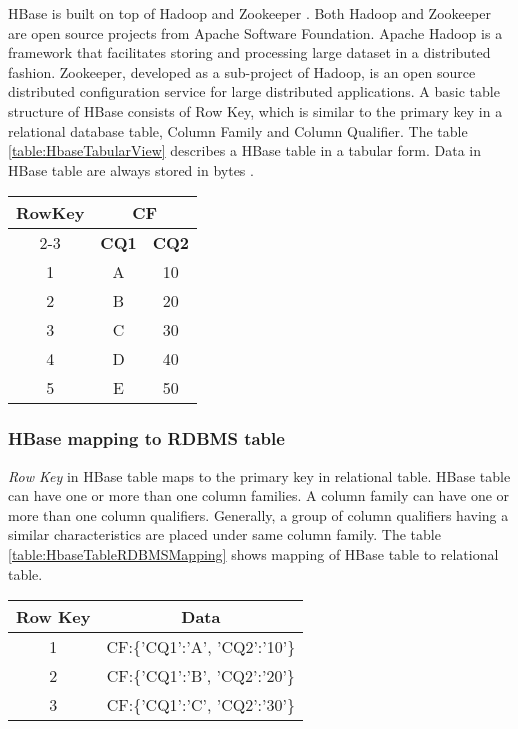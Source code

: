 \documentclass[11pt,a4paper,bibtotoc,idxtotoc,headsepline,footsepline,footexclude,BCOR12mm,DIV13]{scrbook}
\begin{document}
HBase is built on top of Hadoop and Zookeeper \cite{coprocessor:detail}. Both Hadoop and Zookeeper are open source projects from Apache Software Foundation. Apache Hadoop is a framework that facilitates storing and processing large dataset in a distributed fashion. Zookeeper, developed as a sub-project of Hadoop, is an open source distributed configuration service for large distributed applications. A basic table structure of HBase consists of Row Key, which is similar to the primary key in a relational database table, Column Family and Column Qualifier. The table \ref{table:HbaseTabularView} describes a HBase table in a tabular form. Data in HBase table are always stored in bytes \cite{hbase:site}.\newline  


\begin{table*}[htb!]
\centering
\begin{tabular}{|c|c|c|}
\hline
\multirow{2}{*}{\textbf{RowKey}} & \multicolumn{2}{c|}{\textbf{CF}}\\
\cline{2-3}
& \textbf{CQ1} & \textbf{CQ2}\\
\hline
1 & A & 10\\
2 & B & 20\\
3 & C & 30\\
4 & D & 40\\
5 & E & 50\\
\hline
\end{tabular}
\caption{HBase table in tabular view}
\label{table:HbaseTabularView}
\end{table*}
\subsubsection{HBase mapping to RDBMS table}
\emph{Row Key} in HBase table maps to the primary key in relational table. HBase table can have one or more than one column families. A column family can have one or more than one column qualifiers. Generally, a group of column qualifiers having a similar characteristics are placed under same column family. The table \ref{table:HbaseTableRDBMSMapping} shows mapping of HBase table to relational table.

\begin{table*}[htb!]
\centering
\begin{tabular}{|c|c|}
\hline
\textbf{Row Key} & \textbf{Data}\\
\hline
1 & CF:\{'CQ1':'A', 'CQ2':'10'\}\\
2 & CF:\{'CQ1':'B', 'CQ2':'20'\}\\
3 & CF:\{'CQ1':'C', 'CQ2':'30'\}\\
\hline
\end{tabular}
\caption{HBase table mapping to RDBMS table}
\label{table:HbaseTableRDBMSMapping}
\end{table*}
\end{document}
